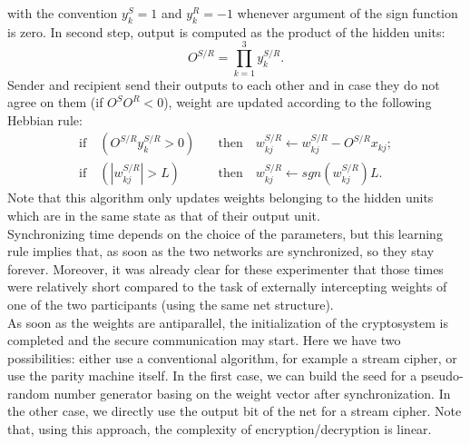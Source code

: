 \documentclass[%
    corpo=11pt,
    twoside,
    stile=classica,
    oldstyle,
    autoretitolo,
    tipotesi=magistrale,
    greek,
    evenboxes,
    english
]{toptesi}
\begin{document}
with the convention $y_k^S = 1$ and $y_k^R = -1$ whenever argument of the sign function is zero. In second step, output is computed as the product of the hidden units:
\begin{equation}
O^{S/R} = \prod_{k=1}^{3}y_k^{S/R}.
\end{equation} 
Sender and recipient send their outputs to each other and in case they do not agree on them (if $O^SO^R<0$), weight are updated according to the following Hebbian rule:
\begin{align}
\text{if} \quad \left(O^{S/R}y_k^{S/R}>0\right) \quad &\text{then} \quad w_{kj}^{S/R} \leftarrow w_{kj}^{S/R} -O^{S/R} x_{kj}; \nonumber \\
\text{if} \quad \left(|w_{kj}^{S/R}|>L\right) \quad &\text{then} \quad w_{kj}^{S/R} \leftarrow sgn\left(w_{kj}^{S/R}\right)L.
\label{hebblearn}
\end{align}
Note that this algorithm only updates weights belonging to the hidden units which are in the same state as that of their output unit. \\
Synchronizing time depends on the choice of the parameters, but this learning rule implies that, as soon as the two networks are synchronized, so they stay forever. Moreover, it was already clear for these experimenter that those times were relatively short compared to the task of externally intercepting weights of one of the two participants (using the same net structure). \\
As soon as the weights are antiparallel, the initialization of the cryptosystem is completed and the secure communication may start. Here we have two possibilities: either use a conventional algorithm, for example a stream cipher, or use the parity machine itself. In the first case, we can build the seed for a pseudo-random number generator basing on the weight vector after synchronization. In the other case, we directly use the output bit of the net for a stream cipher. Note that, using this approach, the complexity of encryption/decryption is linear. 
\end{document}
